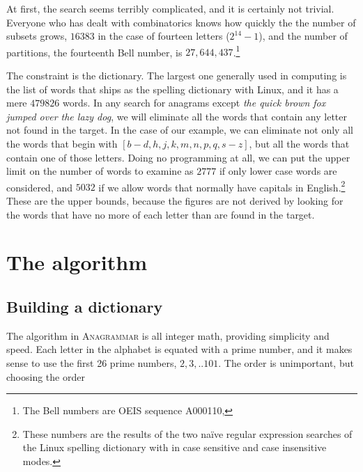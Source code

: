 \documentclass[letterpaper, 11pt]{article}
\providecommand{\anagrammar}{A\textsc{nagrammar}\xspace}
\newcommand{\D}{$\mathfrak{D}$\xspace}
\begin{document}
At first, the search seems terribly complicated, and it is certainly
not trivial. Everyone who has dealt with combinatorics knows how
quickly the the number of subsets grows, $16383$ in the case of
fourteen letters (\ie $2^{14}-1$), and the number of partitions, the fourteenth Bell
number, is $27,644,437$.\footnote{The Bell numbers are OEIS sequence
A000110, }

The constraint is the dictionary. The largest one generally used
in computing is the list of words that ships as the spelling
dictionary with Linux, and it has a mere $479826$ words. In any
search for anagrams except \emph{the quick brown fox jumped over
the lazy dog}, we will eliminate all the words that contain any
letter not found in the target. In the case of our example, we can
eliminate not only all the words that begin with $[b-d,h,j,k,m,n,p,q,s-z]$,
but all the words that contain one of those letters. Doing no
programming at all, we can put the upper limit on the number of
words to examine as $2777$ if only lower case words are considered,
and $5032$ if we allow words that normally have capitals in
English.\footnote{These numbers are the results of the two na\"ive
regular expression searches of the Linux spelling dictionary with
\lit{\textasciicircum[aegnfilor]\textbackslash+\$} in case sensitive
and case insensitive modes.} These are the upper bounds, because
the figures are not derived by looking for the words that have no
more of each letter than are found in the target.

\section{The algorithm}


\subsection{Building a dictionary}

The algorithm in \anagrammar is all integer math, providing
simplicity and speed. 
Each letter in the alphabet is equated with a prime number, and it makes sense
to use the first 26 prime numbers, ${ 2, 3, .. 101}$. The order is 
unimportant, but choosing the order
\end{document}
